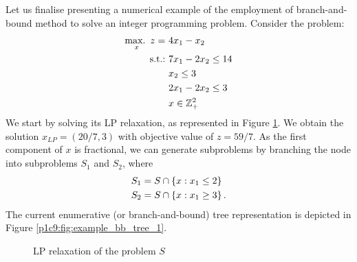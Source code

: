 Let us finalise presenting a numerical example of the employment of branch-and-bound method to solve an integer programming problem. Consider the problem:
%
\begin{align*}
    \mathop{\text{max.~}}_x z = ~& 4x_1 - x_2 \\
    \mathop{\text{s.t.:~}} & 7x_1 - 2x_2 \leq 14 \\
    &x_2 \leq 3 \\
    &2x_1 - 2x_2 \leq 3 \\
    &x \in \mathbb{Z}^2_+
\end{align*} 
%
We start by solving its LP relaxation, as represented in Figure \ref{p1c9:fig:example_LP_relaxation_solution}. We obtain the solution $x_{LP}=(20/7, 3)$ with objective value of $z=59/7$. As the first component of $x$ is fractional, we can generate subproblems by branching the node into subproblems $S_1$ and $S_2$, where
%
\begin{align*}
	& S_1 = S \cap \left\{ x : x_1 \leq 2 \right \} \\
	& S_2 = S \cap \left\{ x : x_1 \geq 3 \right \}.
\end{align*}
%
The current enumerative (or branch-and-bound) tree representation is depicted in Figure \ref{p1c9:fig:example_bb_tree_1}.

\begin{figure}[h]
	\caption{LP relaxation of the problem $S$}\label{p1c9:fig:example_LP_relaxation_solution}	
\end{figure}


